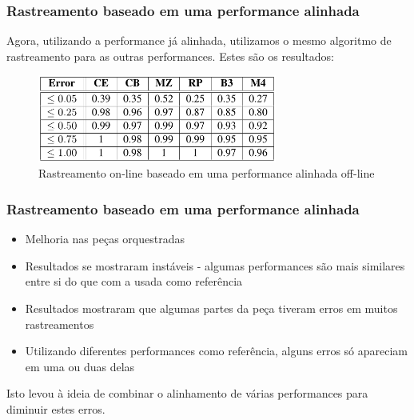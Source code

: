 \begin{frame}
  \frametitle{Rastreamento baseado em uma performance alinhada}
  Agora, utilizando a performance já alinhada, utilizamos o mesmo algoritmo de rastreamento para as outras performances.
  Estes são os resultados:
  \begin{figure}[!ht]
    \centering
    \includegraphics[width=0.7\textwidth]{src/img/3-Table4-1.png}
    \caption*{Rastreamento on-line baseado em uma performance alinhada off-line}
  \end{figure}
\end{frame}

\begin{frame}
  \frametitle{Rastreamento baseado em uma performance alinhada}
  \begin{itemize}
    \item Melhoria nas peças orquestradas\pause
    \item Resultados se mostraram instáveis - algumas performances são mais similares entre si do que com a usada como referência \pause %
    \item Resultados mostraram que algumas partes da peça tiveram erros em muitos rastreamentos \pause %
    \item Utilizando diferentes performances como referência, alguns erros só apareciam em uma ou duas delas \pause
  \end{itemize}
  Isto levou à ideia de combinar o alinhamento de várias performances para diminuir estes erros.
\end{frame}

